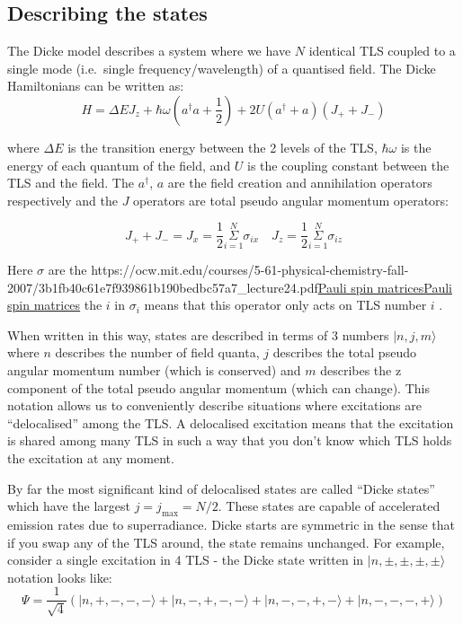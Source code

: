 \documentclass[
]{article}
\let\oldhref\href
\renewcommand{\href}[2]{\ifx#1\urlprefix\oldhref{#1}{#2}\else\uline{\oldhref{#1}{#2}}\fi}
\renewcommand{\[}{\begin{equation}}
\renewcommand{\]}{\end{equation}}
\begin{document}
\subsection{Describing the states}\label{describing-the-states}

The Dicke model describes a system where we have \(N\) identical TLS
coupled to a single mode (i.e.~single frequency/wavelength) of a
quantised field. The Dicke Hamiltonians can be written as: \[
H =  \Delta E J_{z} + \hbar\omega\left(a^{\dagger}a +\frac{1}{2}\right) + 2U\left( a^{\dagger} + a \right)(J_{+} + J_{-})
\label{eq:dickeHpseudo}
\]

where \(\Delta E\) is the transition energy between the 2 levels of the
TLS, \(\hbar\omega\) is the energy of each quantum of the field, and
\(U\) is the coupling constant between the TLS and the field. The
\(a^{\dagger}\), \(a\) are the field creation and annihilation operators
respectively and the \(J\) operators are total pseudo angular momentum
operators:

\[
J_{+} + J_{-} = J_{x} = \frac{1}{2}\overset{N}{\underset{i=1}{\Sigma}} \sigma_{i x} \,\,\,\,\,\, J_{z} = \frac{1}{2}\overset{N}{\underset{i=1}{\Sigma}} \sigma_{i z}
\]

Here \(\sigma\) are the
\href{https://ocw.mit.edu/courses/5-61-physical-chemistry-fall-2007/3b1fb40c61e7f939861b190bedbc57a7_lecture24.pdf}{Pauli
spin matrices} the \(i\) in \(\sigma_i\) means that this operator only
acts on TLS number \(i\) .

When written in this way, states are described in terms of 3 numbers
\(|n, j, m\rangle\) where \(n\) describes the number of field quanta,
\(j\) describes the total pseudo angular momentum number (which is
conserved) and \(m\) describes the z component of the total pseudo
angular momentum (which can change). This notation allows us to
conveniently describe situations where excitations are ``delocalised''
among the TLS. A delocalised excitation means that the excitation is
shared among many TLS in such a way that you don't know which TLS holds
the excitation at any moment.

By far the most significant kind of delocalised states are called
``Dicke states'' which have the largest \(j=j_{\max} = N/2\). These
states are capable of accelerated emission rates due to superradiance.
Dicke starts are symmetric in the sense that if you swap any of the TLS
around, the state remains unchanged. For example, consider a single
excitation in 4 TLS - the Dicke state written in
\(|n,\pm,\pm, \pm, \pm\rangle\) notation looks like: \[
\Psi = \frac{1}{\sqrt{4}}\left(| n, +, -, -, - \rangle + | n, -, +, -, - \rangle + | n, -, -, +, - \rangle + | n, -, -, -, + \rangle \right)
\]
\end{document}
